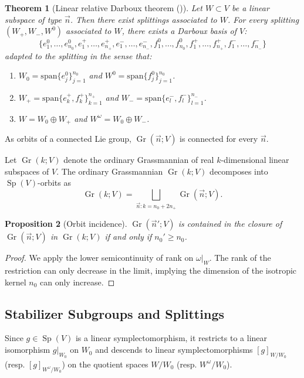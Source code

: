 \documentclass[12pt, final]{article}
\def\Sp{\operatorname{Sp}}
\def\Gr{\operatorname{Gr}}
\newtheorem{theorem}{Theorem}[section]
\newtheorem{proposition}[theorem]{Proposition}
\begin{document}
\begin{theorem}[Linear relative Darboux theorem {\normalfont(\cite[Section 1.2]{ArnoldGivental})}] \label{thm:rel_darboux}
Let $W \subset V$ be a linear subspace of type $\vec{n}$. Then there exist splittings associated to $W$. For every splitting $(W_+, W_-, W^0)$ associated to $W$, there exists a Darboux basis of $V$:
\[
\{e_1^0, \dots, e_{n_0}^0, e_1^+, \dots, e_{n_+}^+, e_1^-, \dots, e_{n_-}^-, f_1^0, \dots, f_{n_0}^0, f_1^+, \dots, f_{n_+}^+, f_1^-, \dots, f_{n_-}^-\}
\]
adapted to the splitting in the sense that:
\begin{enumerate}
    \item $W_0 = \mathrm{span}\{e_j^0\}_{j=1}^{n_0}$ and $W^0 = \mathrm{span}\{f_j^0\}_{j=1}^{n_0}$.
    \item $W_+ = \mathrm{span}\{e_k^+, f_k^+\}_{k=1}^{n_+}$ and $W_- = \mathrm{span}\{e_l^-, f_l^-\}_{l=1}^{n_-}$.
    \item $W = W_0 \oplus W_+$ and $W^\omega = W_0 \oplus W_-$.
\end{enumerate}
\end{theorem}

As orbits of a connected Lie group, $\Gr(\vec{n}; V)$ is connected for every $\vec{n}$. 

Let $\Gr(k; V)$ denote the ordinary Grassmannian of real $k$-dimensional linear subspaces of $V$. The ordinary Grassmannian $\Gr(k; V)$ decomposes into $\Sp(V)$-orbits as
\[ \Gr(k; V) = \bigsqcup_{\vec{n}: k = n_0 + 2n_+} \Gr(\vec{n}; V).\]

\begin{proposition}[Orbit incidence] \label{prop:orbit_incidence}
$\Gr(\vec{n}'; V)$ is contained in the closure of $\Gr(\vec{n}; V)$ in $\Gr(k; V)$ if and only if $n_0' \ge n_0$.
\end{proposition}
\begin{proof}
We apply the lower semicontinuity of rank on $\omega|_W$. The rank of the restriction can only decrease in the limit, implying the dimension of the isotropic kernel $n_0$ can only increase.
\end{proof}



\subsection{Stabilizer Subgroups and Splittings} \label{subsec:stabilizers_splittings}

Since $g \in \Sp(V)$ is a linear symplectomorphism, it restricts to a linear isomorphism $g|_{W_0}$ on $W_0$ and descends to linear symplectomorphisms $[g]_{W/W_0}$ (resp. $[g]_{W^\omega/W_0}$) on the quotient spaces $W/W_0$ (resp. $W^\omega/W_0$).
\end{document}
